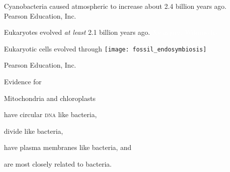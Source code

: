 \documentclass[t]{beamer}
\begin{document}
{
\begin{frame}[b]{Cyanobacteria caused atmospheric  to increase about 2.4 billion years ago.}
\tiny \textcopyright Pearson Education, Inc.
\end{frame}
}
%
{
\begin{frame}[b]{Eukaryotes evolved \emph{at least} 2.1 billion years ago.}
\tiny \textcolor{white}{Xvazquez, Wikimedia, }
\end{frame}
}
%
\begin{frame}[t]{Eukaryotic cells evolved through }
	\texttt{[image: fossil\_endosymbiosis]}
	
	\vfilll
	
	\hfill \tiny \textcopyright Pearson Education, Inc.
\end{frame}
%
{
\begin{frame}

\end{frame}
}
%
\begin{frame}[t]{Evidence for  }

	\hangpara Mitochondria and chloroplasts
	
	\hangpara \hspace*{1em} have circular \textsc{dna} like bacteria,
	
	\hangpara \hspace*{1em} divide like bacteria,
	
	\hangpara \hspace*{1em} have plasma membranes like bacteria, and
	
	\hangpara \hspace*{1em} are most closely related to bacteria.
	
\end{frame}
\end{document}
